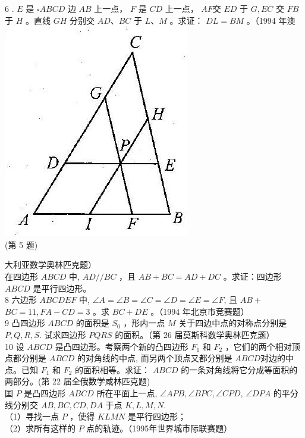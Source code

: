 \documentclass[10pt]{article}
\begin{document}
6 . $E$ 是 $\square A B C D$ 边 $A B$ 上一点， $F$ 是 $C D$ 上一点， $A F$交 $E D$ 于 $G, E C$ 交 $F B$ 于 $H$ 。直线 $G H$ 分别交 $A D 、 B C$ 于 $L 、 M$ 。求证： $D L=B M$ 。（1994 年澳\\
\includegraphics[max width=\textwidth, center]{2024_10_30_2c8f45efd4a519b08e1ag-118}\\
(第 5 题)

大利亚数学奥林匹克题）\\
在四边形 $A B C D$ 中, $A D / / B C$ ，且 $A B+B C=A D+D C$ 。求证：四边形 $A B C D$ 是平行四边形。\\
8 六边形 $A B C D E F$ 中, $\angle A=\angle B=\angle C=\angle D=\angle E=\angle F$, 且 $A B+$ $B C=11, F A-C D=3$ 。求 $B C+D E$ 。（1994 年北京市竞赛题）\\
9 凸四边形 $A B C D$ 的面积是 $S_{0}$ ，形内一点 $M$ 关于四边中点的对称点分别是 $P, Q, R, S$. 试求四边形 $P Q R S$ 的面积。（第 26 届莫斯科数学奥林匹克题）\\
10 设 $A B C D$ 是凸四边形。考察两个新的凸四边形 $F_{1}$ 和 $F_{2}$ ，它们的两个相对顶点都分别是 $A B C D$ 的对角线的中点, 而另两个顶点又都分别是 $A B C D$对边的中点。已知 $F_{1}$ 和 $F_{2}$ 的面积相等。求证： $A B C D$ 的一条对角线将它分成等面积的两部分。(第 22 届全俄数学咸林匹克题)\\
囯 $P$ 是凸四边形 $A B C D$ 所在平面上一点, $\angle A P B, \angle B P C, \angle C P D$, $\angle D P A$ 的平分线分别交 $A B, B C, C D, D A$ 于点 $K, L, M, N$.\\
（1）寻找一点 $P$ ，使得 $K L M N$ 是平行四边形；\\
（2）求所有这样的 $P$ 点的轨迹。（1995年世界城市际联赛题）
\end{document}
